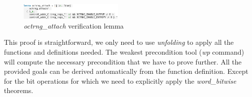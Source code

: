 \documentclass[conference]{IEEEtran}
\begin{document}
\begin{figure}[htbp]
\centerline{\includegraphics[width=0.45\textwidth]{attach_lemma.png}}
\caption{\textit{octrng\_attach} verification lemma} 
\label{fig}
\end{figure}
This proof is straightforward, we only need to use \textit{unfolding} to apply all the functions and definitions needed. The weakest precondition tool (\textit{wp} command) will compute the necessary precondition that we have to prove further. All the provided goals can be derived automatically from the function definition. Except for the bit operations for which we need to explicitly apply the \textit{word\_bitwise} theorems.
\end{document}
